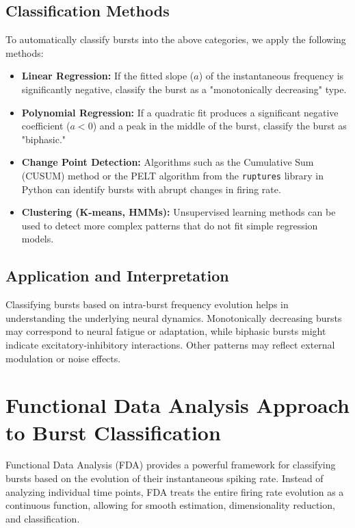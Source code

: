 \documentclass[a4paper,9pt]{extarticle}
\begin{document}
\subsection{Classification Methods}

To automatically classify bursts into the above categories, we apply the following methods:

\begin{itemize}
    \item \textbf{Linear Regression:} If the fitted slope (\( a \)) of the instantaneous frequency is significantly negative, classify the burst as a "monotonically decreasing" type.
    \item \textbf{Polynomial Regression:} If a quadratic fit produces a significant negative coefficient (\( a < 0 \)) and a peak in the middle of the burst, classify the burst as "biphasic."
    \item \textbf{Change Point Detection:} Algorithms such as the Cumulative Sum (CUSUM) method or the PELT algorithm from the \texttt{ruptures} library in Python can identify bursts with abrupt changes in firing rate.
    \item \textbf{Clustering (K-means, HMMs):} Unsupervised learning methods can be used to detect more complex patterns that do not fit simple regression models.
\end{itemize}

\subsection{Application and Interpretation}

Classifying bursts based on intra-burst frequency evolution helps in understanding the underlying neural dynamics. Monotonically decreasing bursts may correspond to neural fatigue or adaptation, while biphasic bursts might indicate excitatory-inhibitory interactions. Other patterns may reflect external modulation or noise effects.

\section{Functional Data Analysis Approach to Burst Classification}

Functional Data Analysis (FDA) provides a powerful framework for classifying bursts based on the evolution of their instantaneous spiking rate. Instead of analyzing individual time points, FDA treats the entire firing rate evolution as a continuous function, allowing for smooth estimation, dimensionality reduction, and classification.
\end{document}
